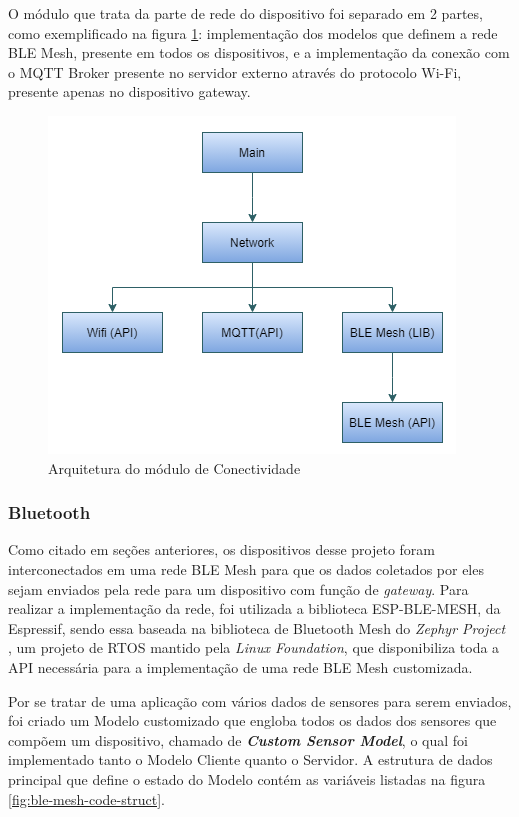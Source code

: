 \documentclass[../monografia.tex]{subfiles}
\begin{document}
O módulo que trata da parte de rede do dispositivo foi separado em 2 partes, como exemplificado na figura \ref{fig:netw-arch}: implementação dos modelos que definem a rede BLE Mesh, presente em todos os dispositivos, e a implementação da conexão com o MQTT Broker presente no servidor externo através do protocolo Wi-Fi, presente apenas no dispositivo gateway.

\begin{figure}[h!]
	\centering
	\includegraphics[scale=0.8]{netw-arch}
	\caption{Arquitetura do módulo de Conectividade} %
	\label{fig:netw-arch}
\end{figure}

\subsubsection{Bluetooth} \label{dev-bluetooth-section}

Como citado em seções anteriores, os dispositivos desse projeto foram interconectados em uma rede BLE Mesh para que os dados coletados por eles sejam enviados pela rede para um dispositivo com função de \textit{gateway}. Para realizar a implementação da rede, foi utilizada a biblioteca ESP-BLE-MESH, da Espressif, sendo essa baseada na biblioteca de Bluetooth Mesh do \textit{Zephyr Project} \cite{zephyrproject}, um projeto de RTOS mantido pela \textit{Linux Foundation}, que disponibiliza toda a API necessária para a implementação de uma rede BLE Mesh customizada.

Por se tratar de uma aplicação com vários dados de sensores para serem enviados, foi criado um Modelo customizado que engloba todos os dados dos sensores que compõem um dispositivo, chamado de \textit{\textbf{Custom Sensor Model}}, o qual foi implementado tanto o Modelo Cliente quanto o Servidor. A estrutura de dados principal que define o estado do Modelo contém as variáveis listadas na figura \ref{fig:ble-mesh-code-struct}.
\end{document}
